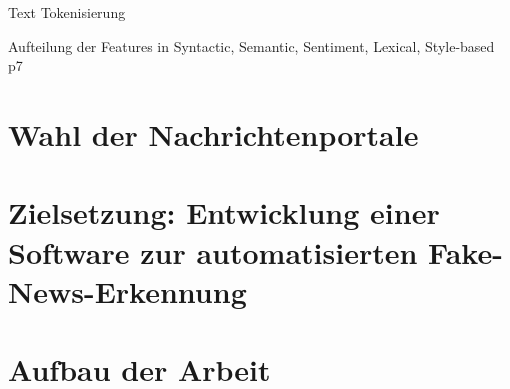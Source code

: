 Text Tokenisierung \cite{Wagner:2010aa}

Aufteilung der Features in Syntactic, Semantic, Sentiment, Lexical, Style-based \cite{Sharma:2024} p7

\section{Wahl der Nachrichtenportale}
\label{sec:wahl_nachrichtenportale}

\section{Zielsetzung: Entwicklung einer Software zur automatisierten Fake-News-Erkennung}
\label{sec:zielsetzung}

\section{Aufbau der Arbeit}
\label{sec:aufbau}

